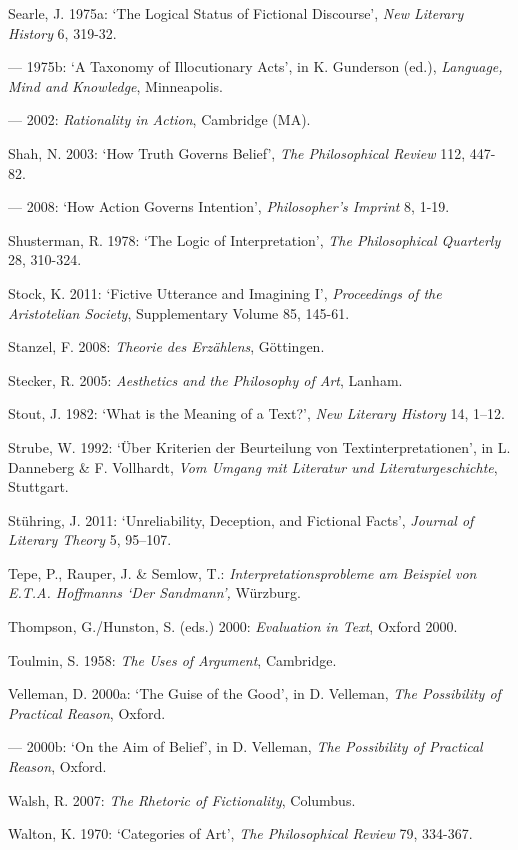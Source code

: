 \begin{hangparas}{.5cm}{1}
Searle, J. 1975a: `The Logical Status of Fictional Discourse', \emph{New Literary History} 6, 319-32.

--- 1975b: `A Taxonomy of Illocutionary Acts', in K. Gunderson (ed.), \emph{Language, Mind and Knowledge}, Minneapolis.

--- 2002: \emph{Rationality in Action}, Cambridge (MA). 

Shah, N. 2003: `How Truth Governs Belief', \emph{The Philosophical Review} 112, 447-82.

--- 2008: `How Action Governs Intention', \emph{Philosopher's Imprint} 8, 1-19.

Shusterman, R. 1978: `The Logic of Interpretation', \emph{The Philosophical Quarterly} 28, 310-324.

Stock, K. 2011: `Fictive Utterance and Imagining I', \emph{Proceedings of the Aristotelian Society}, Supplementary Volume 85, 145-61.

Stanzel, F. 2008: \emph{Theorie des Erz\"ahlens}, G\"ottingen. 

Stecker, R. 2005: \emph{Aesthetics and the Philosophy of Art}, Lanham.

Stout, J. 1982: `What is the Meaning of a Text?', \emph{New Literary History} 14, 1--12.

Strube, W. 1992: `\"Uber Kriterien der Beurteilung von Textinterpretationen', in L. Danneberg \& F. Vollhardt, \emph{Vom Umgang mit Literatur und Literaturgeschichte}, Stuttgart.

St\"uhring, J. 2011: `Unreliability, Deception, and Fictional Facts', \emph{Journal of Literary Theory} 5, 95--107.

Tepe, P., Rauper, J. \& Semlow, T.: \emph{Interpretationsprobleme am Beispiel von E.T.A. Hoffmanns `Der Sandmann',} W\"urzburg.

Thompson, G./Hunston, S. (eds.) 2000: \emph{Evaluation in Text}, Oxford 2000.

Toulmin, S. 1958: \emph{The Uses of Argument}, Cambridge.

Velleman, D. 2000a: `The Guise of the Good', in D. Velleman, \emph{The Possibility of Practical Reason}, Oxford.

--- 2000b: `On the Aim of Belief', in D. Velleman, \emph{The Possibility of Practical Reason}, Oxford.

Walsh, R. 2007: \emph{The Rhetoric of Fictionality}, Columbus.

Walton, K. 1970: `Categories of Art', \emph{The Philosophical Review} 79, 334-367.


\end{hangparas}
